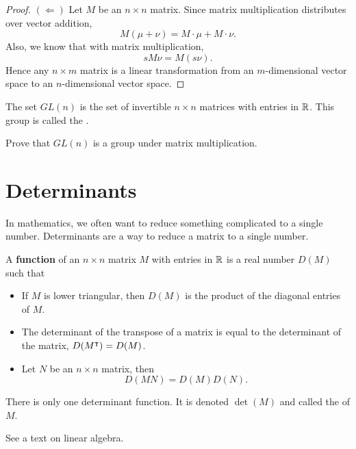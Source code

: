 \documentclass{ximera}
\begin{document}
\begin{lemma}
\begin{proof}
      $(\Leftarrow)$ Let $M$ be an $n\times n$ matrix. Since matrix
    multiplication distributes over vector addition,
      \[
      M(\mu+\nu)  = M\cdot \mu + M\cdot \nu.
      \]
      Also, we know that with matrix multiplication,
      \[
      s M \nu = M(s\nu).
      \]
      Hence any $n\times m$ matrix is a linear transformation from an
      $m$-dimensional vector space to an $n$-dimensional vector
      space.
  \end{proof}
\end{lemma}



\begin{definition}
  The set $GL(n)$ is the set of invertible $n\times n$ matrices with
  entries in $\mathbb R$. This group is called the .
\end{definition}

\begin{exercise}
  Prove that $GL(n)$ is a group under matrix multiplication.
\end{exercise}



\section{Determinants}

In mathematics, we often want to reduce something complicated to a
single number. Determinants are a way to reduce a matrix to a single
number.

\begin{definition}  \label{D:determinants}
A \textbf{ function} of an $n\times n$ matrix $M$
with entries in $\mathbb R$ is a real number $D(M)$ such that
\begin{itemize}
\item If $M$ is lower triangular, then $D(M)$ is the product of the
  diagonal entries of $M$.
\item The determinant of the transpose of a matrix is equal to the
  determinant of the matrix, $D(M^\intercal)=D(M)$.
\item Let $N$ be an $n\times n$ matrix, then
  \[
  D(MN) = D(M) D(N).
  \]
\end{itemize}
\end{definition}


\begin{lemma}  
  There is only one determinant function. It is denoted $\det(M)$ and
  called the  of $M$.
  \begin{sketch}
    See a text on linear algebra.
  \end{sketch}
\end{lemma}
\end{document}
